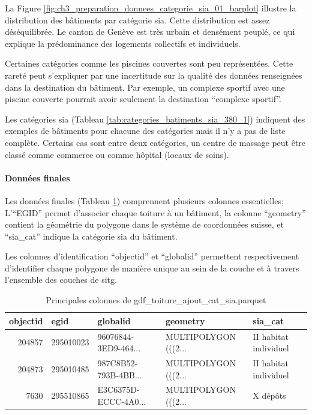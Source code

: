 La Figure \ref{fig:ch3_preparation_donnees_categorie_sia_01_barplot} illustre la distribution des bâtiments par catégorie \gls{sia}. Cette distribution est assez déséquilibrée. Le canton de Genève est très urbain et densément peuplé, ce qui explique la prédominance des logements collectifs et individuels.

Certaines catégories comme les piscines couvertes sont peu représentées. Cette rareté peut s'expliquer par une incertitude sur la qualité des données renseignées dans la destination du bâtiment. Par exemple, un complexe sportif avec une piscine couverte pourrait avoir seulement la destination ``complexe sportif''.

Les catégories \gls{sia} (Tableau \ref{tab:categories_batiments_sia_380_1}) indiquent des exemples de bâtiments pour chacune des catégories mais il n'y a pas de liste complète. Certains cas sont entre deux catégories, un centre de massage peut être classé comme commerce ou comme hôpital (locaux de soins).

\paragraph{Données finales}
Les données finales (Tableau \ref{tab:gdf_toiture_ajout_cat_sia_parquet_head}) comprennent plusieurs colonnes essentielles; L'``EGID'' permet d'associer chaque toiture à un bâtiment, la colonne ``geometry'' contient la géométrie du polygone dans le système de coordonnées suisse, et ``sia\_cat'' indique la catégorie \gls{sia} du bâtiment. 

Les colonnes d'identification ``objectid'' et ``globalid'' permettent respectivement d'identifier chaque polygone de manière unique au sein de la couche et à travers l'ensemble des couches de \acrshort{sitg}.

\begin{table}[H]
\renewcommand{\arraystretch}{2}
\begin{tabular}{@{}rlp{3cm}p{3cm}l@{}}
\toprule
objectid & egid & globalid & geometry & sia\_cat \\
\midrule
204857 & 295010023 & \parbox{3cm}{96076844-3ED9-464...} & \parbox{3cm}{MULTIPOLYGON (((2...} & II habitat individuel \\
204873 & 295010485 & \parbox{3cm}{987C8B52-793B-4BB...} & \parbox{3cm}{MULTIPOLYGON (((2...} & II habitat individuel \\
7630 & 295510865 & \parbox{3cm}{E3C6375D-ECCC-4A0...} & \parbox{3cm}{MULTIPOLYGON (((2...} & X dépôts \\
\bottomrule
\end{tabular}
\caption{Principales colonnes de gdf\_toiture\_ajout\_cat\_sia.parquet}
\label{tab:gdf_toiture_ajout_cat_sia_parquet_head}
\end{table}

